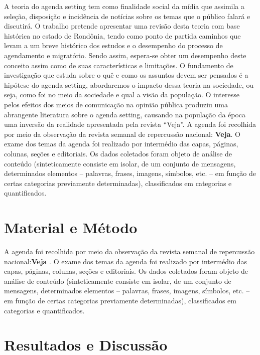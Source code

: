 \documentclass[article,12pt,onesidea,4paper,english,brazil]{abntex2}
\begin{document}
A teoria do agenda setting tem como finalidade social da mídia que assimila a seleção, disposição e incidência de notícias sobre os temas que o público falará e discutirá. O trabalho pretende apresentar uma revisão desta teoria com base histórica no estado de Rondônia, tendo como ponto de partida caminhos que levam a um breve histórico dos estudos e o desempenho do processo de agendamento e migratório. Sendo assim, espera-se obter um desempenho deste conceito assim como de suas características e limitações. O fundamento de investigação que estuda sobre  o  quê  e  como  os  assuntos  devem  ser  pensados  é  a  hipótese  do agenda setting, abordaremos o impacto dessa teoria na sociedade, ou seja, como foi no meio da sociedade e qual a visão da população. O interesse pelos efeitos dos meios de comunicação na opinião pública produziu uma abrangente literatura sobre o agenda setting, causando na população da época uma inversão da realidade apresentada pela revista “Veja”.
A agenda foi recolhida por meio da observação da revista semanal de repercussão nacional: \textbf{Veja}. O exame dos temas da agenda foi realizado por intermédio das capas, páginas, colunas, seções e editoriais. Os dados coletados foram objeto de análise de conteúdo (sinteticamente consiste em isolar, de um conjunto de mensagens, determinados elementos – palavras, frases, imagens, símbolos, etc. – em função de certas categorias previamente determinadas), classificados em categorias e quantificados.
	
	\section*{Material e Método}
	
	A agenda foi recolhida por meio da observação da revista semanal de repercussão nacional:\textbf{Veja} . O exame dos temas da agenda foi realizado por intermédio das capas, páginas, colunas, seções e editoriais. Os dados coletados foram objeto de análise de conteúdo (sinteticamente consiste em isolar, de um conjunto de mensagens, determinados elementos – palavras, frases, imagens, símbolos, etc. – em função de certas categorias previamente determinadas), classificados em categorias e quantificados.
	
	\section*{Resultados e Discussão}
	
\end{document}
